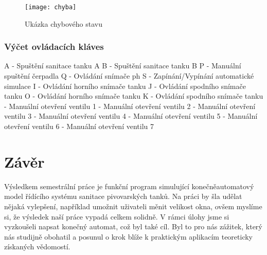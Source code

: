 \documentclass[12pt, a4paper]{article}
\begin{document}
\begin{figure}[h!]
\centering 
\texttt{[image: chyba]}
\caption{Ukázka chybového stavu}
\end{figure}

\subsubsection{Výčet ovládacích kláves} \label{ovladani}
A - Spuštění sanitace tanku A \newline 
B - Spuštění sanitace tanku B \newline 
P - Manuální spuštění čerpadla \newline
Q - Ovládání snímače ph \newline
S - Zapínání/Vypínání automatické simulace \newline
I - Ovládání horního snímače tanku \newline
J - Ovládání spodního snímače tanku \newline
O - Ovládání horního snímače tanku \newline
K - Ovládání spodního snímače tanku  - Manuální otevření ventilu 1  - Manuální otevření ventilu 2  - Manuální otevření ventilu 3  - Manuální otevření ventilu 4  - Manuální otevření ventilu 5  - Manuální otevření ventilu 6  - Manuální otevření ventilu 7 \newline  

\newpage
\section{Závěr}
Výsledkem semestrální práce je funkční program simulující konečněautomatový model řídícího systému sanitace pivovarských tanků. Na práci by šla udělat nějaká vylepšení, například umožnit uživateli měnit velikost okna, ovšem myslíme si, že výsledek naší práce vypadá celkem solidně. V rámci úlohy jsme si vyzkoušeli napsat konečný automat, což byl také cíl. Byl to pro nás zážitek, který nás studijně obohatil a posunul o krok blíže k praktickým aplikacím teoreticky získaných vědomostí. 

\nocite{wiki:Konecny_automat}

\listoffigures



\end{document}
